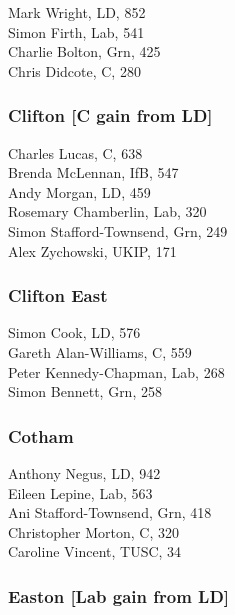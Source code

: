 \documentclass[a4paper,openany,10pt]{book}
\begin{document}
Mark Wright, LD, 852\\
Simon Firth, Lab, 541\\
Charlie Bolton, Grn, 425\\
Chris Didcote, C, 280\\


\subsubsection*{Clifton \hspace*{\fill}\nolinebreak[1]%
\enspace\hspace*{\fill}
[C gain from LD]}



Charles Lucas, C, 638\\
Brenda McLennan, IfB, 547\\
Andy Morgan, LD, 459\\
Rosemary Chamberlin, Lab, 320\\
{Simon Stafford-Townsend}, Grn, 249\\
Alex Zychowski, UKIP, 171\\


\subsubsection*{Clifton East}



Simon Cook, LD, 576\\
Gareth Alan-Williams, C, 559\\
{Peter Kennedy-Chapman}, Lab, 268\\
Simon Bennett, Grn, 258\\


\subsubsection*{Cotham}



Anthony Negus, LD, 942\\
Eileen Lepine, Lab, 563\\
{Ani Stafford-Townsend}, Grn, 418\\
Christopher Morton, C, 320\\
Caroline Vincent, TUSC, 34\\


\subsubsection*{Easton \hspace*{\fill}\nolinebreak[1]%
\enspace\hspace*{\fill}
[Lab gain from LD]}
\end{document}
